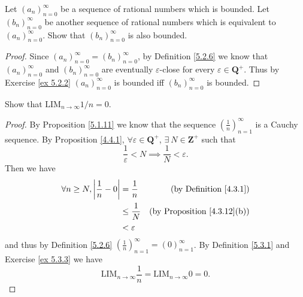 \begin{exercise}\label{ex 5.3.4}
    Let \((a_n)_{n = 0}^{\infty}\) be a sequence of rational numbers which is bounded.
    Let \((b_n)_{n = 0}^{\infty}\) be another sequence of rational numbers which is equivalent to \((a_n)_{n = 0}^{\infty}\).
    Show that \((b_n)_{n = 0}^{\infty}\) is also bounded.
\end{exercise}

\begin{proof}
    Since \((a_n)_{n = 0}^{\infty} = (b_n)_{n = 0}^{\infty}\), by Definition \ref{5.2.6} we know that \((a_n)_{n = 0}^{\infty}\) and \((b_n)_{n = 0}^{\infty}\) are eventually \(\varepsilon\)-close for every \(\varepsilon \in \mathbf{Q}^+\).
    Thus by Exercise \ref{ex 5.2.2} \((a_n)_{n = 0}^{\infty}\) is bounded iff \((b_n)_{n = 0}^{\infty}\) is bounded.
\end{proof}

\begin{exercise}\label{ex 5.3.5}
    Show that \(\text{LIM}_{n \to \infty} 1 / n = 0\).
\end{exercise}

\begin{proof}
    By Proposition \ref{5.1.11} we know that the sequence \((\frac{1}{n})_{n = 1}^{\infty}\) is a Cauchy sequence.
    By Proposition \ref{4.4.1}, \(\forall \varepsilon \in \mathbf{Q}^+\), \(\exists\ N \in \mathbf{Z}^+\) such that
    \[
        \frac{1}{\varepsilon} < N \implies \frac{1}{N} < \varepsilon.
    \]
    Then we have
    \begin{align*}
        \forall n \geq N, \abs*{\frac{1}{n} - 0} & = \frac{1}{n}    & \text{(by Definition \ref{4.3.1})}      \\
                                                 & \leq \frac{1}{N} & \text{(by Proposition \ref{4.3.12}(b))} \\
                                                 & < \varepsilon
    \end{align*}
    and thus by Definition \ref{5.2.6} \((\frac{1}{n})_{n = 1}^\infty = (0)_{n = 1}^\infty\).
    By Definition \ref{5.3.1} and Exercise \ref{ex 5.3.3} we have
    \[
        \text{LIM}_{n \to \infty} \frac{1}{n} = \text{LIM}_{n \to \infty} 0 = 0.
    \]
\end{proof}
